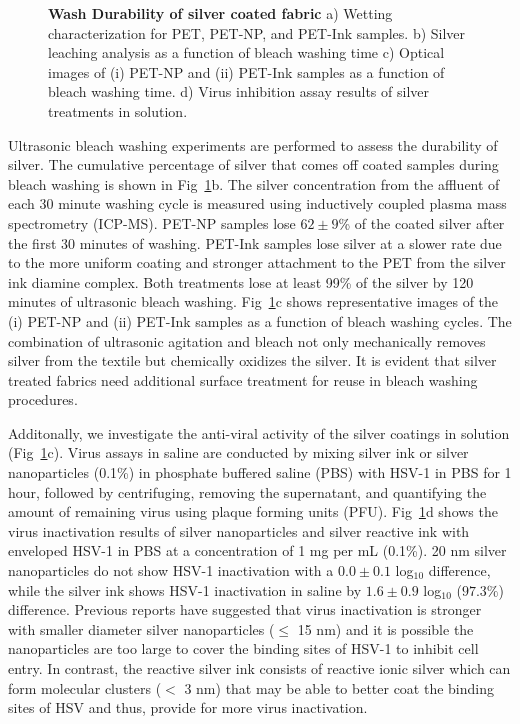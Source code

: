 \documentclass[10pt,letterpaper]{article}
\begin{document}
\begin{figure}[!h]
\caption{{\bf Wash Durability of silver coated fabric}{
a) Wetting characterization for PET, PET-NP, and PET-Ink samples. b) Silver leaching analysis as a function of bleach washing time c) Optical images of (i) PET-NP and (ii) PET-Ink samples as a function of bleach washing time. d) Virus inhibition assay results of silver treatments in solution.}}
\label{fig2}
\end{figure}

Ultrasonic bleach washing experiments are performed to assess the durability of silver.  
The cumulative percentage of silver that comes off coated samples during bleach washing is shown in 
Fig~\ref{fig2}b. The silver concentration from the affluent of each 30 minute washing cycle is measured using inductively coupled plasma mass spectrometry (ICP-MS). 
PET-NP samples lose $62 \pm 9$\% of the coated silver after the first 30 minutes of washing. 
PET-Ink samples lose silver at a slower rate due to the more uniform coating and stronger attachment to the PET from the silver ink diamine complex. 
Both treatments lose at least 99\% of the silver by 120 minutes of ultrasonic bleach washing. 
Fig~\ref{fig2}c shows representative images of the (i) PET-NP and (ii) PET-Ink samples as a function of bleach washing cycles.  
The combination of ultrasonic agitation and bleach not only mechanically removes silver from the textile but chemically oxidizes the silver.  
It is evident that silver treated fabrics need additional surface treatment for reuse in bleach washing procedures. 

Additonally, we investigate the anti-viral activity of the silver coatings in solution (Fig~\ref{fig2}c). 
Virus assays in saline are conducted by mixing silver ink or silver nanoparticles (0.1\%) in phosphate buffered saline (PBS) with HSV-1 in PBS for 1 hour, followed by centrifuging, removing the supernatant, and quantifying the amount of remaining virus using plaque forming units (PFU). 
Fig~\ref{fig2}d shows the virus inactivation results of silver nanoparticles and silver reactive ink
with enveloped HSV-1 in PBS at a concentration of 1 mg per mL (0.1\%). 
20 nm silver nanoparticles do not show HSV-1 inactivation with a $0.0 \pm 0.1$ log$_{10}$ difference, while the silver ink shows HSV-1 inactivation in saline by $1.6 \pm 0.9$ log$_{10}$ ($97.3 %
\%$) difference. 
Previous reports have suggested that virus inactivation is stronger with smaller diameter silver nanoparticles ($\leq$ 15 nm) and it is possible the nanoparticles are too large to cover the binding sites of HSV-1 to inhibit cell entry.\cite{jeremiah_potent_2020}
In contrast, the reactive silver ink %
consists of reactive ionic silver which can form molecular clusters ($<$ 3 nm) that may be able to better coat the binding sites of HSV and thus, provide for more virus inactivation. 
\end{document}
